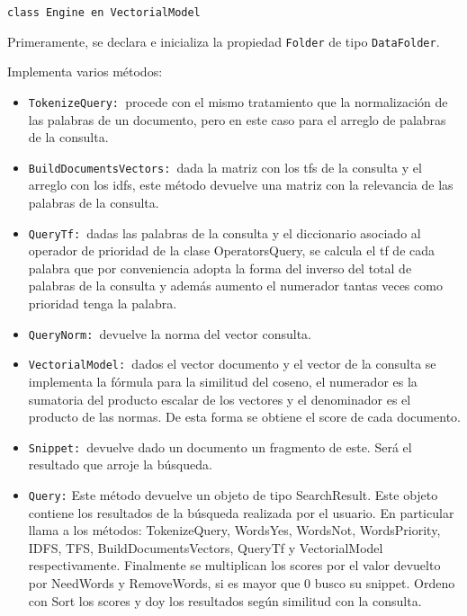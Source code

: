 \documentclass[a4paper, 12pt]{article}
\begin{document}
{\tt class Engine en VectorialModel}
\vspace{0.5cm}

Primeramente, se declara e inicializa la propiedad {\tt Folder} de tipo {\tt DataFolder}.
\vspace{0.5cm} 

Implementa varios métodos:

\begin{itemize}
    \item {\tt TokenizeQuery: }procede con el mismo tratamiento que la normalización
          de las palabras de un documento, pero en este caso para el arreglo de
          palabras de la consulta.
    \item {\tt BuildDocumentsVectors: }dada la matriz con los tfs de la consulta y el
          arreglo con los idfs, este método devuelve una matriz con la relevancia de
          las palabras de la consulta.
\end{itemize}


\begin{itemize}
    \item {\tt QueryTf: }dadas las palabras de la consulta y el diccionario asociado al
          operador de prioridad de la clase OperatorsQuery, se calcula el tf de cada
          palabra que por conveniencia adopta la forma del inverso del total de
          palabras de la consulta y además aumento el numerador tantas veces como
          prioridad tenga la palabra.
    \item {\tt QueryNorm: }devuelve la norma del vector consulta.
\end{itemize}

\begin{itemize}
    \item {\tt VectorialModel: }dados el vector documento y el vector de la consulta
          se implementa la fórmula para la similitud del coseno,
          el numerador es la sumatoria del producto escalar de los vectores y el
          denominador es el producto de las normas. De esta forma se obtiene el score
          de cada documento.
    \item {\tt Snippet:  }devuelve dado un documento un fragmento de este. Será el
          resultado que arroje la búsqueda.
\end{itemize}

\begin{itemize}
    \item {\tt Query:} Este método devuelve un objeto de tipo SearchResult.
          Este objeto contiene los resultados de la búsqueda realizada por el usuario.
          En particular llama a los métodos: TokenizeQuery, WordsYes, WordsNot, WordsPriority, IDFS,
          TFS, BuildDocumentsVectors, QueryTf y VectorialModel respectivamente.
          Finalmente se multiplican los scores por el valor devuelto por NeedWords y
          RemoveWords, si es mayor que 0 busco su snippet. Ordeno con Sort los
          scores y doy los resultados según similitud con la consulta.
\end{itemize}
\end{document}
